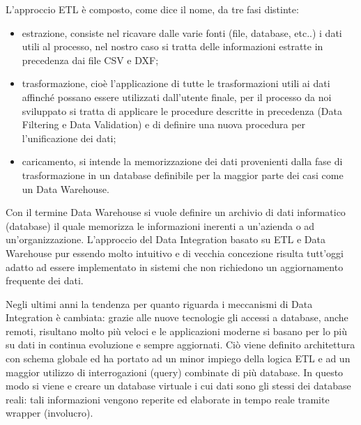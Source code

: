 \documentclass[12pt]{report}
\begin{document}
L'approccio ETL è composto, come dice il nome, da tre fasi distinte:
\begin{itemize}
\item estrazione, consiste nel ricavare dalle varie fonti (file, database, etc..) i dati utili al processo, nel nostro caso si tratta delle informazioni estratte in precedenza dai file CSV e DXF;
\item trasformazione, cioè l'applicazione di tutte le trasformazioni utili ai dati affinché possano essere utilizzati dall'utente finale, per il processo da noi sviluppato si tratta di applicare le procedure descritte in precedenza (Data Filtering e Data Validation) e di definire una nuova procedura per l'unificazione dei dati;
\item caricamento, si intende la memorizzazione dei dati provenienti dalla fase di trasformazione in un database definibile per la maggior parte dei casi come un Data Warehouse.
\end{itemize}


Con il termine Data Warehouse si vuole definire un archivio di dati informatico (database) il quale memorizza le informazioni inerenti a un'azienda o ad un'organizzazione.
L'approccio del Data Integration basato su ETL e Data Warehouse pur essendo molto intuitivo e di vecchia concezione risulta tutt'oggi adatto ad essere implementato in sistemi che non richiedono un aggiornamento frequente dei dati.

\vspace{5mm} %

Negli ultimi anni la tendenza per quanto riguarda i meccanismi di Data Integration è cambiata: grazie alle nuove tecnologie gli accessi a database, anche remoti, risultano molto più veloci e le applicazioni moderne si basano per lo più su dati in continua evoluzione e sempre aggiornati.
Ciò viene definito architettura con schema globale ed ha portato ad un minor impiego della logica ETL e ad un maggior utilizzo di interrogazioni (query) combinate di più database.
In questo modo si viene e creare un database virtuale i cui dati sono gli stessi dei database reali: tali informazioni vengono reperite ed elaborate in tempo reale tramite wrapper (involucro).
\end{document}
